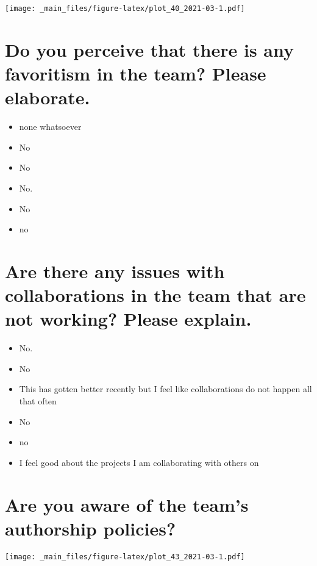 \documentclass[
]{book}
\providecommand{\tightlist}{%
  \setlength{\itemsep}{0pt}\setlength{\parskip}{0pt}}
\begin{document}
\texttt{[image: \_main\_files/figure-latex/plot\_40\_2021-03-1.pdf]}

\hypertarget{do-you-perceive-that-there-is-any-favoritism-in-the-team-please-elaborate.-1}{%
\section{Do you perceive that there is any favoritism in the team? Please elaborate.}\label{do-you-perceive-that-there-is-any-favoritism-in-the-team-please-elaborate.-1}}

\begin{itemize}
\tightlist
\item
  none whatsoever
\item
  No
\item
  No
\item
  No.
\item
  No
\item
  no
\end{itemize}

\hypertarget{are-there-any-issues-with-collaborations-in-the-team-that-are-not-working-please-explain.-1}{%
\section{Are there any issues with collaborations in the team that are not working? Please explain.}\label{are-there-any-issues-with-collaborations-in-the-team-that-are-not-working-please-explain.-1}}

\begin{itemize}
\tightlist
\item
  No.
\item
  No
\item
  This has gotten better recently but I feel like collaborations do not happen all that often
\item
  No
\item
  no
\item
  I feel good about the projects I am collaborating with others on
\end{itemize}

\hypertarget{are-you-aware-of-the-teams-authorship-policies-1}{%
\section{Are you aware of the team's authorship policies?}\label{are-you-aware-of-the-teams-authorship-policies-1}}

\texttt{[image: \_main\_files/figure-latex/plot\_43\_2021-03-1.pdf]}
\end{document}
